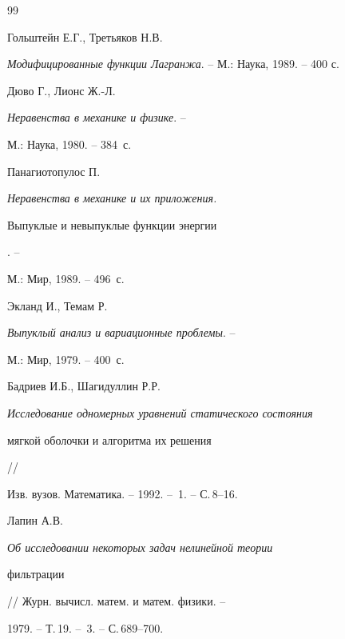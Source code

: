 \begin{thebibliography}{99}





 Гольштейн Е.Г., Третьяков Н.В. 


{\em Модифицированные функции Лагранжа}. -- М.: Наука, 1989. -- 400 с.


 




Дюво Г., Лионс Ж.-Л.


{\em Неравенства в механике и физике}. --


М.: Наука, 1980. -- 384~с.







Панагиотопулос П.


{\em Неравенства в механике и их приложения. 


Выпуклые и невыпуклые функции энергии}. --


М.: Мир, 1989. -- 496~с.





 Экланд И., Темам Р.


{\em Выпуклый анализ и вариационные проблемы}. --


М.: Мир, 1979. -- 400~с.





 Бадриев И.Б., Шагидуллин Р.Р. 


{\em Исследование одномерных уравнений статического состояния


мягкой оболочки и алгоритма их решения} // 


Изв. вузов. Математика. -- 1992. -- \No\,1. -- С.\,8--16. 








 Лапин А.В.


{\em Об исследовании некоторых задач нелинейной теории 


фильтрации} // Журн. вычисл. матем. и матем. физики. --


1979. -- Т.\,19. -- \No\,3. -- С.\,689--700.








\end{thebibliography}
